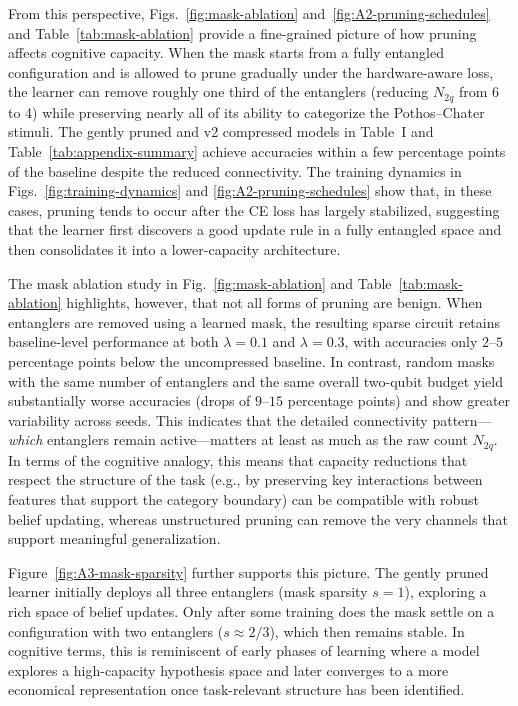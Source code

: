 \documentclass[conference]{IEEEtran}
\begin{document}
From this perspective, Figs.~\ref{fig:mask-ablation}
and~\ref{fig:A2-pruning-schedules} and Table~\ref{tab:mask-ablation} provide a
fine-grained picture of how pruning affects cognitive capacity. When the mask
starts from a fully entangled configuration and is allowed to prune gradually
under the hardware-aware loss, the learner can remove roughly one third of the
entanglers (reducing $N_{2q}$ from 6 to 4) while preserving nearly all of its
ability to categorize the Pothos--Chater stimuli. The gently pruned and v2
compressed models in Table~I and Table~\ref{tab:appendix-summary} achieve
accuracies within a few percentage points of the baseline despite the reduced
connectivity. The training dynamics in Figs.~\ref{fig:training-dynamics} and
\ref{fig:A2-pruning-schedules} show that, in these cases, pruning tends to
occur after the CE loss has largely stabilized, suggesting that the learner
first discovers a good update rule in a fully entangled space and then
consolidates it into a lower-capacity architecture.

The mask ablation study in Fig.~\ref{fig:mask-ablation} and
Table~\ref{tab:mask-ablation} highlights, however, that not all forms of
pruning are benign. When entanglers are removed using a learned mask, the
resulting sparse circuit retains baseline-level performance at both
$\lambda=0.1$ and $\lambda=0.3$, with accuracies only $2$--$5$ percentage
points below the uncompressed baseline. In contrast, random masks with the
same number of entanglers and the same overall two-qubit budget yield
substantially worse accuracies (drops of $9$--$15$ percentage points) and show
greater variability across seeds. This indicates that the detailed connectivity
pattern—\emph{which} entanglers remain active—matters at least as much as the
raw count $N_{2q}$. In terms of the cognitive analogy, this means that
capacity reductions that respect the structure of the task (e.g., by
preserving key interactions between features that support the category
boundary) can be compatible with robust belief updating, whereas unstructured
pruning can remove the very channels that support meaningful generalization.

Figure~\ref{fig:A3-mask-sparsity} further supports this picture. The gently
pruned learner initially deploys all three entanglers (mask sparsity $s=1$),
exploring a rich space of belief updates. Only after some training does the
mask settle on a configuration with two entanglers ($s\approx 2/3$), which
then remains stable. In cognitive terms, this is reminiscent of early phases
of learning where a model explores a high-capacity hypothesis space and later
converges to a more economical representation once task-relevant structure has
been identified.
\end{document}
